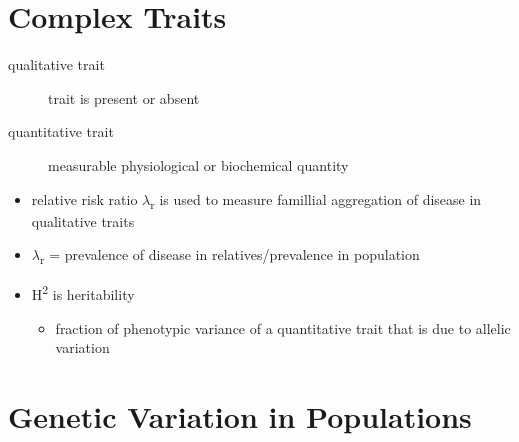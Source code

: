 \documentclass[12pt]{scrartcl}
\begin{document}
\section{Complex Traits}
\label{sec:org3732a76}
\begin{description}
\item[{qualitative trait}] trait is present or absent
\item[{quantitative trait}] measurable physiological or biochemical quantity
\end{description}


\begin{itemize}
\item relative risk ratio \(\lambda\)\textsubscript{r} is used to measure famillial
aggregation of disease in qualitative traits

\item \(\lambda\)\textsubscript{r} = prevalence of disease in relatives/prevalence in population

\item H\textsuperscript{2} is heritability
\begin{itemize}
\item fraction of phenotypic variance of a quantitative trait that is
due to allelic variation
\end{itemize}
\end{itemize}
\section{Genetic Variation in Populations}
\label{sec:orgd979bf4}
\end{document}
